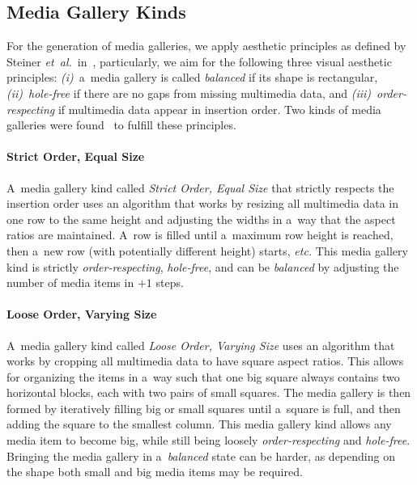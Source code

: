 \documentclass{sig-alternate}
\begin{document}
\subsection{Media Gallery Kinds}

For the generation of media galleries, we apply aesthetic principles
as defined by Steiner \emph{et~al.}\
in~\cite{steiner2013tocrop,steiner2012aesthetic},
particularly, we aim for the following
three visual aesthetic principles:
\emph{(i)}~a~media gallery is called \emph{balanced}
if its shape is rectangular,
\emph{(ii)}~\emph{hole-free}
if there are no gaps from missing multimedia data,
and \emph{(iii)}~\emph{order-respecting}
if multimedia data appear in insertion order.
Two kinds of media galleries were found~\cite{steiner2013tocrop}
to fulfill these principles.

\paragraph{Strict Order, Equal Size}

A~media gallery kind called \emph{Strict Order, Equal Size}
that strictly respects the insertion order
uses an algorithm that works by resizing all multimedia data
in one row to the same height and adjusting the widths
in a~way that the aspect ratios are maintained.
A~row is filled until a~maximum row height is reached,
then a~new row (with potentially different height) starts, \emph{etc.}
This media gallery kind is strictly \emph{order-respecting},
\emph{hole-free}, and can be \emph{balanced}
by adjusting the number of media items in $+1$ steps.

\paragraph{Loose Order, Varying Size}

A~media gallery kind called \emph{Loose Order, Varying Size}
uses an algorithm that works by cropping all multimedia data
to have square aspect ratios.
This allows for organizing the items in a~way such that one big square
always contains two horizontal blocks,
each with two pairs of small squares.
The media gallery is then formed by iteratively filling
big or small squares until a~square is full,
and then adding the square to the smallest column.
This media gallery kind allows any media item to become big,
while still being loosely \emph{order-respecting} and \emph{hole-free}.
Bringing the media gallery in a~\emph{balanced} state can be harder,
as depending on the shape both small and big
media items may be required.
\end{document}
